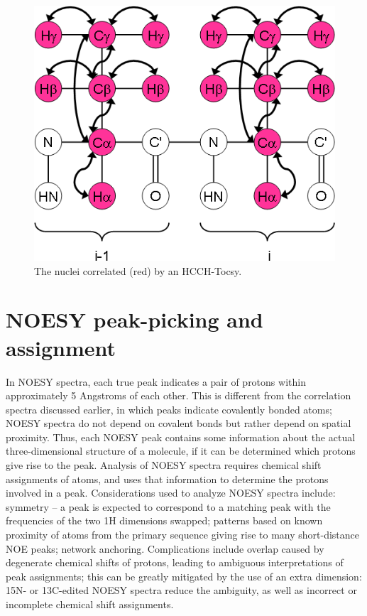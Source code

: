 \begin{figure}
  \includegraphics[scale=0.5]{figures/ccpn_hcchtocsy}
  \caption[The nuclei correlated by an HCCH-Tocsy.]
          {The nuclei correlated (red) by an HCCH-Tocsy.}
  \label{ccpn_hcchtocsy}
\end{figure}


\section{NOESY peak-picking and assignment}

In NOESY spectra, each true peak indicates a pair of protons within 
approximately 5 Angstroms of each other.  This is different from the 
correlation spectra discussed earlier, in which peaks indicate covalently 
bonded atoms; NOESY spectra do not depend on covalent bonds but rather 
depend on spatial proximity.  Thus, each NOESY peak contains some information 
about the actual three-dimensional structure of a molecule, if it can be 
determined which protons give rise to the peak.  Analysis of NOESY spectra 
requires chemical shift assignments of atoms, and uses that information to 
determine the protons involved in a peak.  Considerations used to analyze 
NOESY spectra include: symmetry -- a peak is expected to correspond to a 
matching peak with the frequencies of the two 1H dimensions swapped; patterns 
based on known proximity of atoms from the primary sequence giving rise to 
many short-distance NOE peaks; network anchoring.  Complications include 
overlap caused by degenerate chemical shifts of protons, leading to 
ambiguous interpretations of peak assignments; this can be greatly mitigated 
by the use of an extra dimension:  15N- or 13C-edited NOESY spectra reduce 
the ambiguity, as well as incorrect or incomplete chemical shift assignments.

